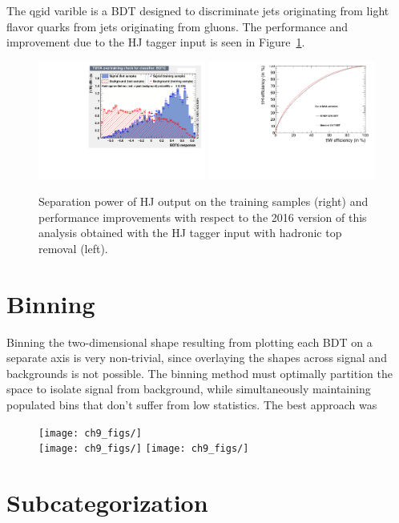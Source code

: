 \noindent The qgid varible is a BDT designed to discriminate jets originating from light flavor quarks from jets originating from gluons. The performance and improvement due
to the HJ tagger input is seen in Figure~\ref{fig:hj_tagger}.

\begin{figure}[htp]
\centering
\includegraphics[width=0.49\textwidth]{ch9_figs/Jtagger_Ks.pdf}
\includegraphics[width=0.49\textwidth]{ch9_figs/Roc_Comparison_18Feb.pdf}
\caption[Performance improvement from the HJ tagger and hadronic top removal]{Separation power of HJ output on the training samples (right) and performance improvements with respect to the 2016 version of this analysis obtained with the HJ
tagger input with hadronic top removal (left).}
\label{fig:hj_tagger}
\end{figure}

\section{Binning}
Binning the two-dimensional shape resulting from plotting each BDT on a separate axis is very non-trivial, since overlaying the shapes across signal and backgrounds is not possible. The binning method must optimally partition the space to isolate
signal from background, while simultaneously maintaining populated bins that don't suffer from low statistics. The best approach was 

\begin{figure}[htp]
\centering
\texttt{[image: ch9\_figs/]}\\
\texttt{[image: ch9\_figs/]}
\texttt{[image: ch9\_figs/]}
\caption[Two dimensional BDT output shapes of signal and backgrounds]{}
\label{fig:2d_shapes}
\end{figure}


\section{Subcategorization}


